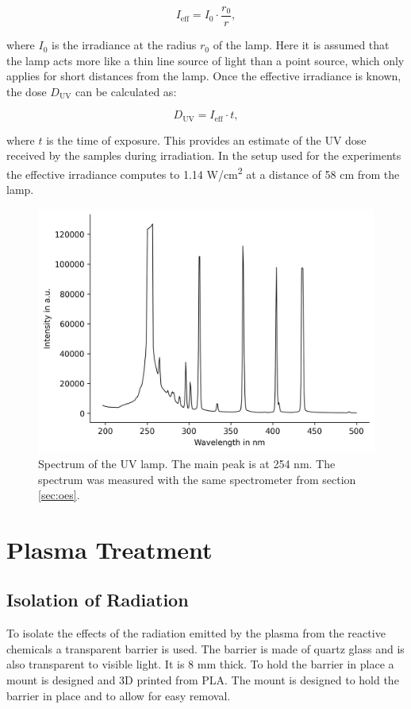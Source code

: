 \begin{equation}
I_\text{eff} = I_0 \cdot \frac{r_0}{r},
\end{equation}

where $I_0$ is the irradiance at the radius $r_0$ of the lamp. Here it is assumed that the lamp acts more like a thin line source of light than a point source, which only applies for short distances from the lamp. Once the effective irradiance is known, the dose $D_\text{UV}$ can be calculated as:

\begin{equation}
D_\text{UV} = I_\text{eff} \cdot t,
\label{eq:uv_dose}
\end{equation}

where $t$ is the time of exposure. This provides an estimate of the UV dose received by the samples during irradiation. In the setup used for the experiments the effective irradiance computes to 1.14 \textmu W/cm\textsuperscript{2} at a distance of 58 cm from the lamp.


\begin{figure}
    \centering
    \includegraphics[width=.8\textwidth]{images/UV_lamp_no_glass.png}
    \caption[Spectrum of UV lamp]{Spectrum of the UV lamp. The main peak is at 254 nm. The spectrum was measured with the same spectrometer from section \ref{sec:oes}.}
    \label{fig:uv}
\end{figure}

\section{Plasma Treatment}

\subsection{Isolation of Radiation}
To isolate the effects of the radiation emitted by the plasma from the reactive chemicals a transparent barrier is used. The barrier is made of quartz glass and is also transparent to visible light. It is 8 mm thick. To hold the barrier in place a mount is designed and 3D printed from PLA. The mount is designed to hold the barrier in place and to allow for easy removal.

